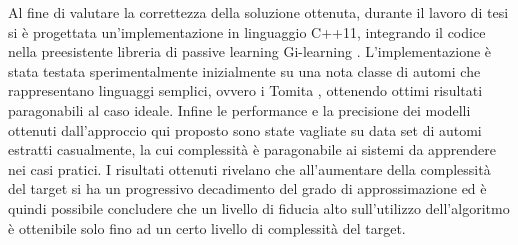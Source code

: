 Al fine di valutare la correttezza della soluzione ottenuta, durante il lavoro di tesi si è progettata un'implementazione in linguaggio C++11, integrando il codice nella preesistente libreria di passive learning Gi-learning \cite{Cot16}. L'implementazione è stata testata sperimentalmente inizialmente su una nota classe di automi che rappresentano linguaggi semplici, ovvero i Tomita \cite{Tomita82, Dupont94}, ottenendo ottimi risultati paragonabili al caso ideale.
Infine le performance e la precisione dei modelli ottenuti dall'approccio qui proposto sono state vagliate su data set di automi estratti casualmente, la cui complessità è paragonabile ai sistemi da apprendere nei casi pratici. I risultati ottenuti rivelano che all'aumentare della complessità del target si ha un progressivo decadimento del grado di approssimazione ed è quindi possibile concludere che un livello di fiducia alto sull'utilizzo dell'algoritmo è ottenibile solo fino ad un certo livello di complessità del target.
